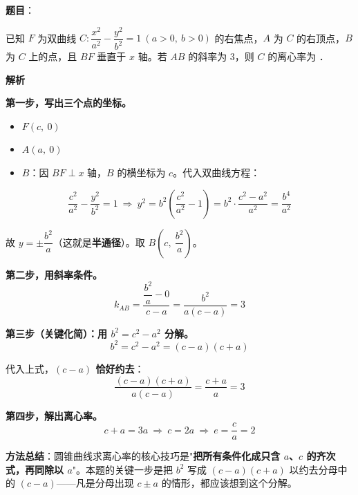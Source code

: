 \begin{answer}

\textbf{题目}：

已知 $F$ 为双曲线 $C:\dfrac{x^{2}}{a^{2}}-\dfrac{y^{2}}{b^{2}}=1\ (a>0,\ b>0)$ 的右焦点，$A$ 为 $C$ 的右顶点，$B$ 为 $C$ 上的点，且 $BF$ 垂直于 $x$ 轴。若 $AB$ 的斜率为 $3$，则 $C$ 的离心率为 \gkblank{}．

\textbf{解析}

\textbf{第一步，写出三个点的坐标。}

\begin{itemize}
\item $F(c,\ 0)$
\item $A(a,\ 0)$
\item $B$：因 $BF\perp x$ 轴，$B$ 的横坐标为 $c$。代入双曲线方程：
\end{itemize}
\nopagebreak[4]
\[\frac{c^{2}}{a^{2}}-\frac{y^{2}}{b^{2}}=1\ \Longrightarrow\ y^{2}=b^{2}\left(\frac{c^{2}}{a^{2}}-1\right)=b^{2}\cdot\frac{c^{2}-a^{2}}{a^{2}}=\frac{b^{4}}{a^{2}}\]

故 $y=\pm\dfrac{b^{2}}a$（这就是\textbf{半通径}）。取 $B\left(c,\ \dfrac{b^{2}}a\right)$。

\textbf{第二步，用斜率条件。}
\nopagebreak[4]
\[k_{AB}=\frac{\dfrac{b^{2}}a-0}{c-a}=\frac{b^{2}}{a(c-a)}=3\]

\textbf{第三步（关键化简）：用 $b^{2}=c^{2}-a^{2}$ 分解。}
\nopagebreak[4]
\[b^{2}=c^{2}-a^{2}=(c-a)(c+a)\]

代入上式，\textbf{$(c-a)$ 恰好约去}：
\nopagebreak[4]
\[\frac{(c-a)(c+a)}{a(c-a)}=\frac{c+a}a=3\]

\textbf{第四步，解出离心率。}
\nopagebreak[4]
\[c+a=3a\ \Longrightarrow\ c=2a\ \Longrightarrow\ e=\frac ca=2\]

\begin{gktip}
\textbf{方法总结}：圆锥曲线求离心率的核心技巧是"\textbf{把所有条件化成只含 $a$、$c$ 的齐次式，再同除以 $a$}"。本题的关键一步是把 $b^{2}$ 写成 $(c-a)(c+a)$ 以约去分母中的 $(c-a)$——凡是分母出现 $c\pm a$ 的情形，都应该想到这个分解。
\end{gktip}


\par\medskip

\end{answer}
